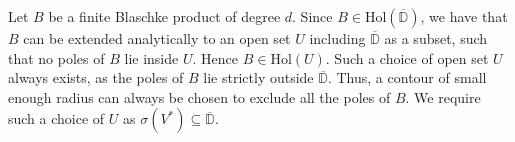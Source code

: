 \documentclass[10pt, reqno]{amsart}
\newtheorem{corollary}[theorem]{Corollary}
\theoremstyle{definition}
\numberwithin{equation}{section}
\begin{document}



  







Let $B$ be a finite Blaschke product of degree $d$. Since $B\in\mathrm{Hol}(\overline{\mathbb{D}})$, we have that $B$ can be extended analytically to an open set $U$ including $\overline{\mathbb{D}}$ as a subset, such that no poles of $B$ lie inside $U$. Hence $B\in\mathrm{Hol}(U)$. Such a choice of open set $U$ always exists, as the poles of $B$ lie strictly outside $\overline{\mathbb{D}}$. Thus, a contour of small enough radius can always be chosen to exclude all the poles of $B$. We require such a choice of $U$ as $\sigma(V^{*})\subseteq\overline{\mathbb{D}}$.
\end{document}
